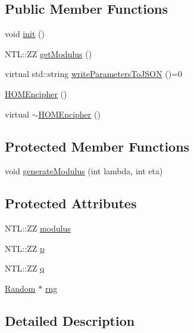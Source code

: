 \subsection*{Public Member Functions}
\begin{DoxyCompactItemize}
\item 
void \hyperlink{classHOMEncipher_aefdaccfe94ca8bd67a3ed1f5f045b04a}{init} ()
\item 
N\+T\+L\+::\+ZZ \hyperlink{classHOMEncipher_a43f920fd7feb8f3c9c6532c4935a6922}{get\+Modulus} ()
\item 
virtual std\+::string \hyperlink{classHOMEncipher_abf176e3fb85de6f0f6a2c96563397d39}{write\+Parameters\+To\+J\+S\+ON} ()=0
\item 
\hyperlink{classHOMEncipher_a08c76156f4f64433ead6ed2a1f142ffe}{H\+O\+M\+Encipher} ()
\item 
virtual \hyperlink{classHOMEncipher_a93b5c48425b0ac327757795703ecd2d7}{$\sim$\+H\+O\+M\+Encipher} ()
\end{DoxyCompactItemize}
\subsection*{Protected Member Functions}
\begin{DoxyCompactItemize}
\item 
void \hyperlink{classHOMEncipher_a6a715a6beed3174acc8d812d570462ca}{generate\+Modulus} (int lambda, int eta)
\end{DoxyCompactItemize}
\subsection*{Protected Attributes}
\begin{DoxyCompactItemize}
\item 
N\+T\+L\+::\+ZZ \hyperlink{classHOMEncipher_aa645061096356f6e2fd5ad3f0dfc1fc1}{modulus}
\item 
N\+T\+L\+::\+ZZ \hyperlink{classHOMEncipher_a57eb1b665612ec7caaa601af9b809866}{p}
\item 
N\+T\+L\+::\+ZZ \hyperlink{classHOMEncipher_ab9e6d7d4d4574c74a08169441e3213b2}{q}
\item 
\hyperlink{classRandom}{Random} $\ast$ \hyperlink{classHOMEncipher_a93a3cf6c4d8c7105380a2b13a08db774}{rng}
\end{DoxyCompactItemize}


\subsection{Detailed Description}
